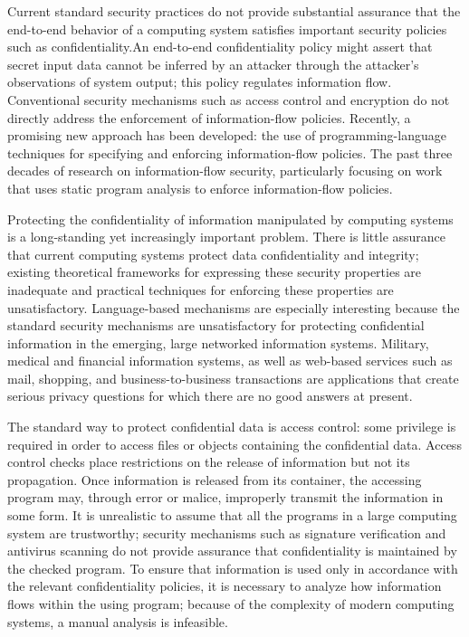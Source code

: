 Current standard security practices do not provide
substantial assurance that the end-to-end behavior of a
computing system satisfies important security policies such as
confidentiality.An end-to-end confidentiality policy might assert
that secret input data cannot be inferred by an attacker through
the attacker's observations of system output; this policy regulates
information flow.
Conventional security mechanisms such as access control
and encryption do not directly address the enforcement of
information-flow policies. Recently, a promising new approach
has been developed: the use of programming-language techniques
for specifying and enforcing information-flow policies.
The past three decades of research on
information-flow security, particularly focusing on work that uses
static program analysis to enforce information-flow policies. 

Protecting the confidentiality of information manipulated
by computing systems is a long-standing yet increasingly
important problem. There is little assurance that
current computing systems protect data confidentiality and
integrity; existing theoretical frameworks for expressing these
security properties are inadequate and practical techniques for
enforcing these properties are unsatisfactory. Language-based mechanisms are especially interesting because
the standard security mechanisms are unsatisfactory
for protecting confidential information in the emerging, large
networked information systems. Military, medical and financial
information systems, as well as web-based services such
as mail, shopping, and business-to-business transactions are
applications that create serious privacy questions for which
there are no good answers at present.

The standard way to protect confidential data is 
access control: some privilege is required in order to
access files or objects containing the confidential data. Access
control checks place restrictions on the release of information
but not its propagation. Once information is released from
its container, the accessing program may, through error or
malice, improperly transmit the information in some form. It is
unrealistic to assume that all the programs in a large computing
system are trustworthy; security mechanisms such as signature
verification and antivirus scanning do not provide assurance
that confidentiality is maintained by the checked program. To
ensure that information is used only in accordance with the
relevant confidentiality policies, it is necessary to analyze how
information flows within the using program; because of the
complexity of modern computing systems, a manual analysis
is infeasible.

